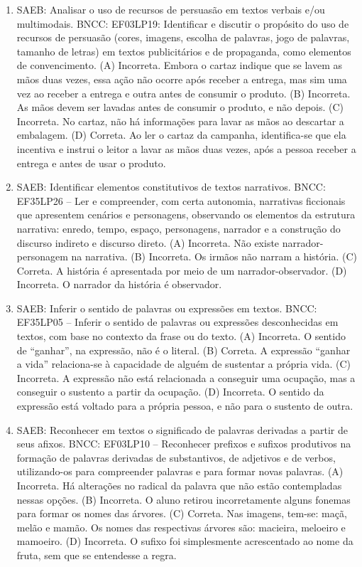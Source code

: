\begin{enumerate}
\item
SAEB: Analisar o uso de recursos de persuasão em textos verbais e/ou multimodais.
BNCC: EF03LP19: Identificar e discutir o propósito do uso de recursos de persuasão (cores,
imagens, escolha de palavras, jogo de palavras, tamanho de letras) em textos publicitários
e de propaganda, como elementos de convencimento.
(A) Incorreta. Embora o cartaz indique que se lavem as mãos duas vezes,
essa ação não ocorre após receber a entrega, mas sim uma vez ao receber
a entrega e outra antes de consumir o produto.
(B) Incorreta. As mãos devem ser lavadas antes de consumir o produto, e
não depois.
(C) Incorreta. No cartaz, não há informações para lavar as mãos ao descartar a embalagem.
(D) Correta. Ao ler o cartaz da campanha, identifica-se que ela
incentiva e instrui o leitor a lavar as mãos duas vezes, após a pessoa
receber a entrega e antes de usar o produto.

\item
SAEB: Identificar elementos constitutivos de textos narrativos.
BNCC: EF35LP26 -- Ler e compreender, com certa autonomia, narrativas
ficcionais que apresentem cenários e personagens, observando os
elementos da estrutura narrativa: enredo, tempo, espaço, personagens,
narrador e a construção do discurso indireto e discurso direto.
(A) Incorreta. Não existe narrador-personagem na narrativa.
(B) Incorreta. Os irmãos não narram a história.
(C) Correta. A história é apresentada por meio de um narrador-observador.
(D) Incorreta. O narrador da história é observador.

\item
SAEB: Inferir o sentido de palavras ou expressões em textos.
BNCC: EF35LP05 -- Inferir o sentido de palavras ou expressões desconhecidas em textos, com base no
contexto da frase ou do texto.
(A) Incorreta. O sentido de ``ganhar'', na expressão, não é o literal.
(B) Correta. A expressão ``ganhar a vida'' relaciona-se à capacidade de alguém de sustentar a própria vida.
(C) Incorreta. A expressão não está relacionada a conseguir uma ocupação, mas a conseguir o sustento a partir da ocupação.
(D) Incorreta. O sentido da expressão está voltado para a própria pessoa, e não para o sustento de outra.

\item
SAEB: Reconhecer em textos o significado de palavras derivadas a partir de seus afixos.
BNCC: EF03LP10 -- Reconhecer prefixos e sufixos produtivos na formação de
palavras derivadas de substantivos, de adjetivos e de verbos,
utilizando-os para compreender palavras e para formar novas palavras.
(A) Incorreta. Há alterações no radical da palavra que não estão contempladas nessas opções.
(B) Incorreta. O aluno retirou incorretamente alguns fonemas para formar
os nomes das árvores.
(C) Correta. Nas imagens, tem-se: maçã, melão e mamão. Os nomes das respectivas árvores são: macieira, meloeiro e mamoeiro.
(D) Incorreta. O sufixo foi simplesmente acrescentado ao nome da fruta, sem que se entendesse a regra.


\end{enumerate}
